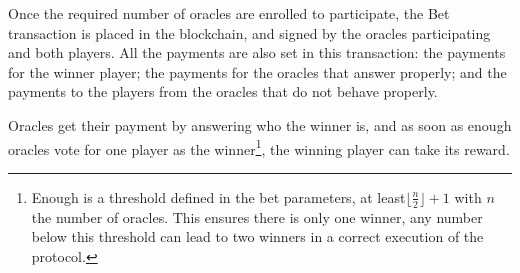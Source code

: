 Once the required number of oracles are enrolled to participate, the Bet
  transaction is placed in the blockchain, and signed by the oracles
  participating and both players.
All the payments are also set in this transaction: the payments for the winner
  player; the payments for the oracles that answer properly; and the payments
  to the players from the oracles that do not behave properly.

Oracles get their payment by answering who the winner is, and as soon as
  enough oracles vote for one player as the winner\footnote{Enough is a
  threshold defined in the bet parameters, at least$\lfloor \frac{n}{2}
  \rfloor + 1$ with $n$ the number of oracles. This ensures there is only
  one winner, any number below this threshold can lead to two winners
  in a correct execution of the protocol.}, the winning  player can take
  its reward.
